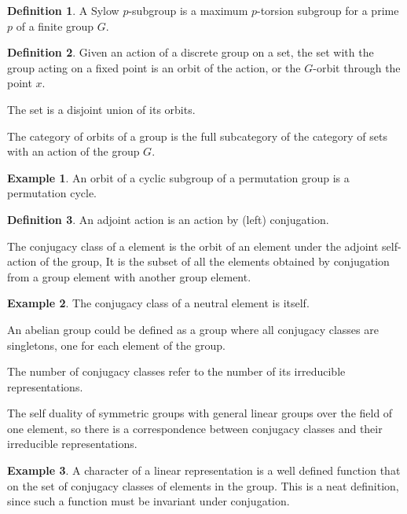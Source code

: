 \documentclass[10pt]{article}
\theoremstyle{plain}%
\theoremstyle{definition}
\newtheorem{definition}{Definition}[section]
\newtheorem{example}{Example}[section]
\theoremstyle{remark}
\begin{document}
\begin{definition}
	A Sylow $p$-subgroup is a maximum $p$-torsion subgroup for a prime $p$ of a finite group $G$.
\end{definition}

\begin{definition}
	Given an action of a discrete group on a set, the set with the group acting on a fixed point is an orbit of the action, or the $G$-orbit through the point $x$.

	The set is a disjoint union of its orbits.

	The category of orbits of a group is the full subcategory of the category of sets with an action of the group $G$.
\end{definition}

\begin{example}
	An orbit of a cyclic subgroup of a permutation group is a permutation cycle.
\end{example}

\begin{definition}
	An adjoint action is an action by (left) conjugation.

	The conjugacy class of a element is the orbit of an element under the adjoint self-action of the group, It is the subset of all the elements obtained by conjugation from a group element with another group element.
\end{definition}

\begin{example}
	The conjugacy class of a neutral element is itself.

	An abelian group could be defined as a group where all conjugacy classes are singletons, one for each element of the group.

	The number of conjugacy classes refer to the number of its irreducible representations.

	The self duality of symmetric groups with general linear groups over the field of one element, so there is a correspondence between conjugacy classes and their irreducible representations.
\end{example}

\begin{example}
	A character of a linear representation is a well defined function that on the set of conjugacy classes of elements in the group. This is a neat definition, since such a function must be invariant under conjugation.
\end{example}
\end{document}
